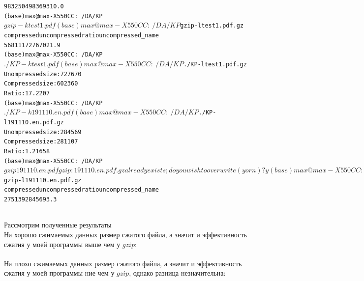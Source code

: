 \begin{alltt}
            9832504             9836931   0.0%
(base) max@max-X550CC:~/DA/KP$ gzip -k test1.pdf 
(base) max@max-X550CC:~/DA/KP$ gzip -l test1.pdf.gz 
         compressed        uncompressed  ratio uncompressed_name
             568111              727670  21.9%
(base) max@max-X550CC:~/DA/KP$ ./KP -k test1.pdf 
(base) max@max-X550CC:~/DA/KP$ ./KP -l test1.pdf.gz 
Unompressed size: 727670
Compressed size: 602360
Ratio: 17.2207%
(base) max@max-X550CC:~/DA/KP$ ./KP -k 191110.en.pdf 
(base) max@max-X550CC:~/DA/KP$ ./KP -l 191110.en.pdf.gz 
Unompressed size: 284569
Compressed size: 281107
Ratio: 1.21658%
(base) max@max-X550CC:~/DA/KP$ gzip 191110.en.pdf 
gzip: 191110.en.pdf.gz already exists; do you wish to overwrite (y or n)? y
(base) max@max-X550CC:~/DA/KP$ gzip -l 191110.en.pdf.gz 
         compressed        uncompressed  ratio uncompressed_name
             275139              284569   3.3%
\end{alltt} \\

{\bfserises Рассмотрим полученные результаты} \\

На хорошо сжимаемых данных размер сжатого файла, а значит и эффективность сжатия у моей программы выше чем у $gzip$: \\

{} \\

На плохо сжимаемых данных размер сжатого файла, а значит и эффективность сжатия у моей программы ние чем у $gzip$, однако разница незначительна: \\

{} \\

\pagebreak

